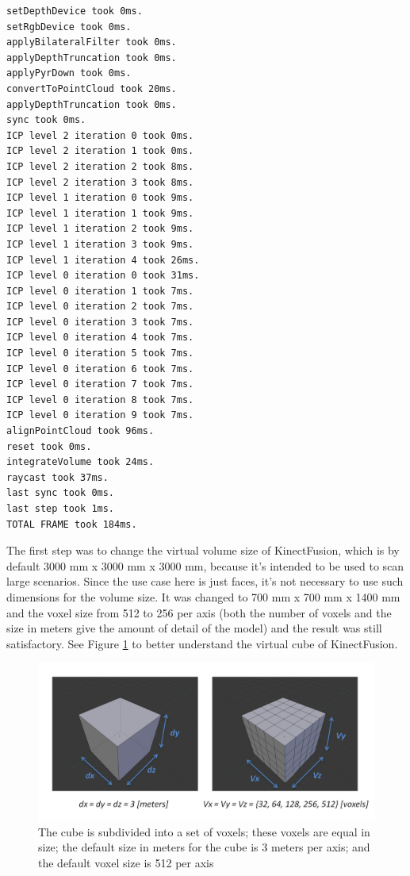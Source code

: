 \documentclass[msc, a4paper, classic, en]{ufbathesis}
\begin{document}
\begin{verbatim}
setDepthDevice took 0ms.
setRgbDevice took 0ms.
applyBilateralFilter took 0ms.
applyDepthTruncation took 0ms.
applyPyrDown took 0ms.
convertToPointCloud took 20ms.
applyDepthTruncation took 0ms.
sync took 0ms.
ICP level 2 iteration 0 took 0ms.
ICP level 2 iteration 1 took 0ms.
ICP level 2 iteration 2 took 8ms.
ICP level 2 iteration 3 took 8ms.
ICP level 1 iteration 0 took 9ms.
ICP level 1 iteration 1 took 9ms.
ICP level 1 iteration 2 took 9ms.
ICP level 1 iteration 3 took 9ms.
ICP level 1 iteration 4 took 26ms.
ICP level 0 iteration 0 took 31ms.
ICP level 0 iteration 1 took 7ms.
ICP level 0 iteration 2 took 7ms.
ICP level 0 iteration 3 took 7ms.
ICP level 0 iteration 4 took 7ms.
ICP level 0 iteration 5 took 7ms.
ICP level 0 iteration 6 took 7ms.
ICP level 0 iteration 7 took 7ms.
ICP level 0 iteration 8 took 7ms.
ICP level 0 iteration 9 took 7ms.
alignPointCloud took 96ms.
reset took 0ms.
integrateVolume took 24ms.
raycast took 37ms.
last sync took 0ms.
last step took 1ms.
TOTAL FRAME took 184ms.
\end{verbatim}

The first step was to change the virtual volume size of KinectFusion, which is by default 3000 mm x 3000 mm x 3000 mm, because it's intended to be used to scan large scenarios. Since the use case here is just faces, it's not necessary to use such dimensions for the volume size. It was changed to 700 mm x 700 mm x 1400 mm and the voxel size from 512 to 256 per axis (both the number of voxels and the size in meters give the amount of detail of the model) and the result was still satisfactory. See Figure \ref{fig:kinfu} to better understand the virtual cube of KinectFusion.

\begin{figure}
\centering
\includegraphics[width=1\textwidth]{images/kinfu.jpg}
\caption{The cube is subdivided into a set of voxels; these voxels are equal in size; the default size in meters for the cube is 3 meters per axis; and the default voxel size is 512 per axis \cite{pclkinfu}}
\label{fig:kinfu}
\end{figure}
\end{document}
